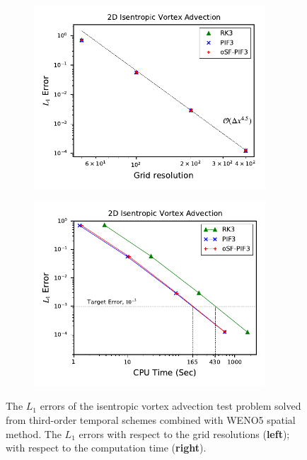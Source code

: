 \begin{figure}
    \centering
    \begin{subfigure}{70mm}
        \centering
        \includegraphics[width=0.95\textwidth]{fig/vortex_third}
    \end{subfigure}
    \begin{subfigure}{70mm}
        \centering
        \includegraphics[width=0.95\textwidth]{fig/vortex_time_third}
    \end{subfigure}
    \caption{The \( L_{1} \) errors of the isentropic vortex advection test problem
        solved from third-order temporal schemes combined with WENO5 spatial method.
        The \( L_{1} \) errors
        with respect to the grid resolutions (\textbf{left});
        with respect to the computation time (\textbf{right}).
    }\label{fig:vortex_third}
\end{figure}

